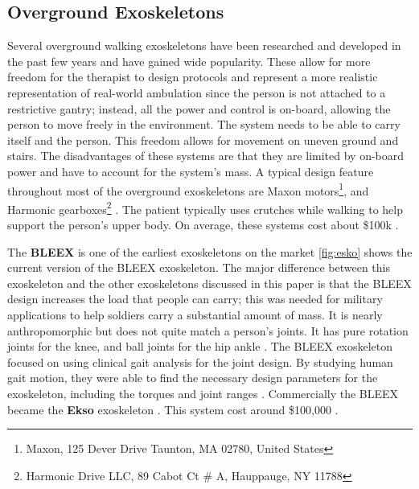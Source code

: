 \subsection{Overground Exoskeletons}

Several overground walking exoskeletons have been researched and developed in the past few years and have gained wide popularity. These allow for more freedom for the therapist to design protocols and represent a more realistic representation of real-world ambulation \cite{8110705} since the person is not attached to a restrictive gantry; instead, all the power and control is on-board, allowing the person to move freely in the environment. The system needs to be able to carry itself and the person. This freedom allows for movement on uneven ground and stairs. The disadvantages of these systems are that they are limited by on-board power and have to account for the system's mass. A typical design feature throughout most of the overground exoskeletons are Maxon motors\footnote{Maxon, 125 Dever Drive Taunton, MA 02780, United States}, and Harmonic gearboxes\footnote{Harmonic Drive LLC, 89 Cabot Ct # A, Hauppauge, NY 11788} \cite{bortole2015h2} \cite{aliman2017design}. The patient typically uses crutches while walking to help support the person's upper body. On average, these systems cost about \$100k \cite{rupal2017lower}.


The \textbf{BLEEX} is one of the earliest exoskeletons on the market \autoref{fig:esko} shows the current version of the BLEEX exoskeleton. The major difference between this exoskeleton and the other exoskeletons discussed in this paper is that the BLEEX design increases the load that people can carry; this was needed for military applications to help soldiers carry a substantial amount of mass. It is nearly anthropomorphic but does not quite match a person's joints. It has pure rotation joints for the knee, and ball joints for the hip ankle \cite{chu2005biomimetic}\cite{zoss2006biomechanical}. The BLEEX exoskeleton focused on using clinical gait analysis for the joint design. By studying human gait motion, they were able to find the necessary design parameters for the exoskeleton, including the torques and joint ranges \cite{zoss2005mechanical}. Commercially the BLEEX became the \textbf{Ekso} exoskeleton \cite{zoss2016human}. This system cost around \$100,000 \cite{nichols_2018}. 


